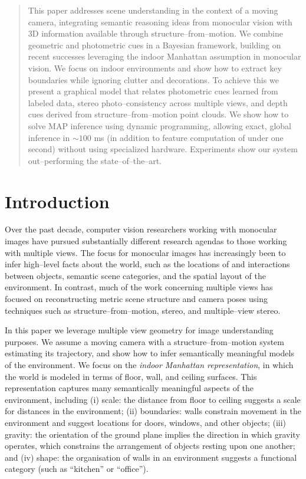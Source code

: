 \begin{abstract}
  This paper addresses scene understanding in the context of a moving
  camera, integrating semantic reasoning ideas from monocular vision
  with 3D information available through structure--from--motion. We
  combine geometric and photometric cues in a Bayesian framework,
  building on recent successes leveraging the indoor Manhattan
  assumption in monocular vision. We focus on indoor environments and
  show how to extract key boundaries while ignoring clutter and
  decorations. To achieve this we present a graphical model that
  relates photometric cues learned from labeled data, stereo
  photo--consistency across multiple views, and depth cues derived
  from structure--from--motion point clouds. We show how to solve MAP
  inference using dynamic programming, allowing exact, global
  inference in $\sim$$100$ ms (in addition to feature computation of
  under one second) without using specialized hardware. Experiments
  show our system out--performing the state--of--the--art.
\end{abstract}

\section{Introduction}
Over the past decade, computer vision researchers working with
monocular images have pursued substantially different research
agendas to those working with multiple views. The focus for
monocular images has increasingly been to infer high--level facts
about the world, such as the locations of and interactions between
objects, semantic scene categories, and the spatial layout of the
environment. In contrast, much of the work concerning multiple views
has focused on reconstructing metric scene structure and camera poses
using techniques such as structure--from--motion, stereo, and
multiple--view stereo.

In this paper we leverage multiple view geometry for image
understanding purposes. We assume a moving camera with a
structure--from--motion system estimating its trajectory, and show how
to infer semantically meaningful models of the environment. We focus
on the \textit{indoor Manhattan representation}\cite{Lee09,FlintECCV10}, in which the world is
modeled in terms of floor, wall, and ceiling surfaces. This
representation captures many semantically meaningful aspects of the
environment, including (i) scale: the distance from floor to ceiling
suggests a scale for distances in the environment; (ii) boundaries:
walls constrain movement in the environment and suggest locations for
doors, windows, and other objects; (iii) gravity: the orientation of
the ground plane implies the direction in which gravity operates,
which constrains the arrangement of objects resting upon one another;
and (iv) shape: the organisation of walls in an environment suggests
a functional category (such as ``kitchen'' or ``office'').


